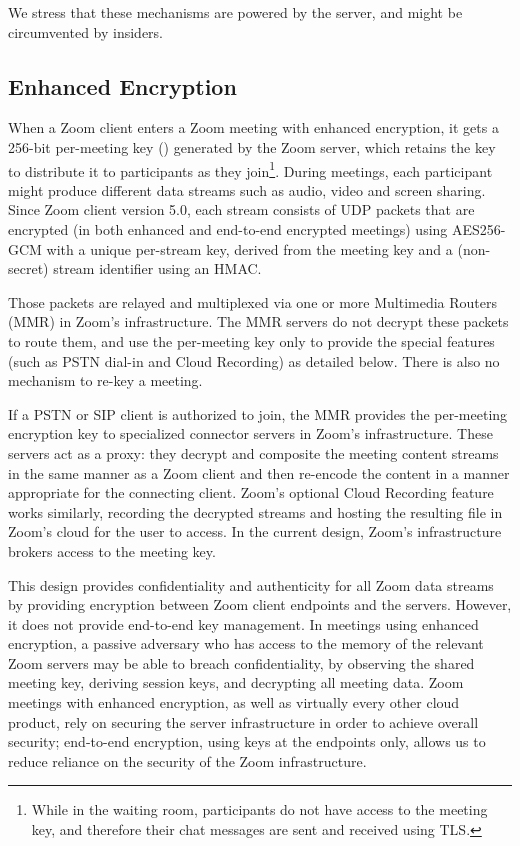 We stress that these mechanisms are powered by the server, and might be circumvented by insiders.

\subsection{Enhanced Encryption}
When a Zoom client enters a Zoom meeting with enhanced encryption, it gets a 256-bit per-meeting key
(\MK) generated by the Zoom server, which retains the key to distribute it to participants as they
join\footnote{While in the waiting room, participants do not have access to the meeting key, and
therefore their chat messages are sent and received using TLS.}. During meetings, each participant
might produce different data streams such as audio, video and screen sharing. Since Zoom client
version 5.0, each stream consists of UDP packets that are encrypted (in both enhanced and end-to-end
encrypted meetings) using AES256-GCM with a unique per-stream key, derived from the meeting key and
a (non-secret) stream identifier using an HMAC.

Those packets are relayed and multiplexed via one or more Multimedia Routers (MMR) in Zoom's
infrastructure. The MMR servers do not decrypt these packets to route them, and use the per-meeting
key only to provide the special features (such as PSTN dial-in and Cloud Recording) as detailed
below. There is also no mechanism to re-key a meeting.

If a PSTN or SIP client is authorized to join, the MMR provides the per-meeting encryption key to
specialized connector servers in Zoom's infrastructure. These servers act as a proxy: they decrypt
and composite the meeting content streams in the same manner as a Zoom client and then re-encode the
content in a manner appropriate for the connecting client. Zoom's optional Cloud Recording feature
works similarly, recording the decrypted streams and hosting the resulting file in Zoom's cloud for
the user to access. In the current design, Zoom's infrastructure brokers access to the meeting key.

This design provides confidentiality and authenticity for all Zoom data streams by providing
encryption between Zoom client endpoints and the servers. However, it does not provide end-to-end
key management. In meetings using enhanced encryption, a passive adversary who has access to the
memory of the relevant Zoom servers may be able to breach confidentiality, by observing the shared
meeting key, deriving session keys, and decrypting all meeting data. Zoom meetings with enhanced
encryption, as well as virtually every other cloud product, rely on securing the server
infrastructure in order to achieve overall security; end-to-end encryption, using keys at the
endpoints only, allows us to reduce reliance on the security of the Zoom infrastructure.

